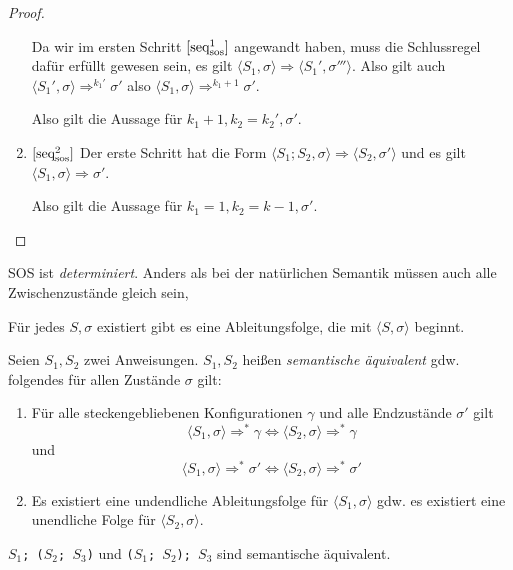 \begin{proof}
\begin{enumerate}
            Da wir im ersten Schritt $\infruleSos[1]{seq}$ angewandt haben, muss die Schlussregel dafür erfüllt gewesen sein, \dh{} es gilt $\langle S_1, \sigma \rangle \Rightarrow \langle S_1', \sigma''' \rangle$. Also gilt auch $\langle S_1', \sigma \rangle \Rightarrow^{k_1'} \sigma'$ also $\langle S_1, \sigma \rangle \Rightarrow^{k_1+1} \sigma'$.

            Also gilt die Aussage für $k_1 + 1, k_2 = k_2', \sigma'$.
        \item $\infruleSos[2]{seq}$ Der erste Schritt hat die Form $\langle S_1; S_2, \sigma \rangle \Rightarrow \langle S_2, \sigma' \rangle$ und es gilt $\langle S_1, \sigma \rangle \Rightarrow \sigma'$.

            Also gilt die Aussage für $k_1 = 1, k_2 = k - 1, \sigma'$.
    \end{enumerate}
\end{proof}


\begin{lemma}[Determinierheit]
    SOS ist \emph{determiniert}. Anders als bei der natürlichen Semantik müssen auch alle Zwischenzustände gleich sein, \dh{}

        Für jedes $S, \sigma$ existiert gibt es eine Ableitungsfolge, die mit $\langle S, \sigma \rangle$ beginnt.
\end{lemma}


\begin{definition}
    Seien $S_1, S_2$ zwei Anweisungen. $S_1, S_2$ heißen \emph{semantische äquivalent} gdw. folgendes für allen Zustände $\sigma$ gilt:

    \begin{enumerate}
        \item Für alle steckengebliebenen Konfigurationen $\gamma$ und alle Endzustände $\sigma'$ gilt
            \[
                \langle S_1, \sigma \rangle \Rightarrow^* \gamma \Leftrightarrow \langle S_2, \sigma \rangle \Rightarrow^* \gamma
            \]
            und
            \[
                \langle S_1, \sigma \rangle \Rightarrow^* \sigma' \Leftrightarrow \langle S_2, \sigma \rangle \Rightarrow^* \sigma'
            \]
        \item Es existiert eine undendliche Ableitungsfolge für $\langle S_1, \sigma \rangle$ gdw. es existiert eine unendliche Folge für $\langle S_2, \sigma \rangle$.
    \end{enumerate}
\end{definition}

\par\medskip
\begin{example}
    \texttt{$S_1$; ($S_2$; $S_3$)} und \texttt{($S_1$; $S_2$); $S_3$} sind semantische äquivalent.
\end{example}




